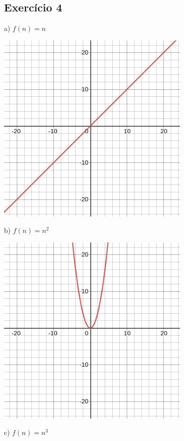 \documentclass[12pt]{article}
\begin{document}
\subsection{Exercício 4}
  a) $f(n) = n$
  \begin{center}
    \includegraphics[width=0.7\textwidth]{graphics/a.png}
  \end{center}
  b) $f(n) = n^{2}$
  \begin{center}
    \includegraphics[width=0.7\textwidth]{graphics/b.png}\\
  \end{center}
  c) $f(n) = n^{3}$
\end{document}
